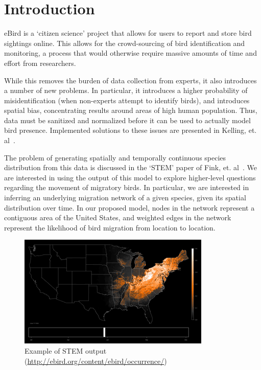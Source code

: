 \section{Introduction}
eBird\cite{DBLP:conf/iaai/KellingGFLWYDG12} is a `citizen science' project that allows for users to report and store bird sightings online. This allows for the crowd-sourcing of bird identification and monitoring, a process that would otherwise require massive amounts of time and effort from researchers. 

While this removes the burden of data collection from experts, it also introduces a number of new problems. In particular, it introduces a higher probability of misidentification (when non-experts attempt to identify birds), and introduces spatial bias, concentrating results around areas of high human population. Thus, data must be sanitized and normalized before it can be used to actually model bird presence. Implemented solutions to these issues are presented in Kelling, et. al~\cite{DBLP:conf/iaai/KellingGFLWYDG12}.

The problem of generating spatially and temporally continuous species distribution from this data is discussed in the `STEM' paper of Fink, et. al~\cite{stem}. We are interested in using the output of this model to explore higher-level questions regarding the movement of migratory birds. In particular, we are interested in inferring an underlying migration network of a given species, given its spatial distribution over time. In our proposed model, nodes in the network represent a contiguous area of the United States, and weighted edges in the network represent the likelihood of bird migration from location to location. 

\begin{figure}[h!]
\centering
\includegraphics[scale=0.65] {stem}
\caption[Caption for]{Example of STEM output (\url{http://ebird.org/content/ebird/occurrence/})}
\label{fig:00}
\end{figure}
